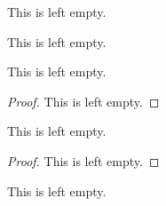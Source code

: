 \begin{example}
    This is left empty.
\end{example}

\begin{definition}
    This is left empty.
\end{definition}

\begin{proposition}
    This is left empty.
    \begin{proof}
        This is left empty.
    \end{proof}
\end{proposition}

\begin{proposition}
    This is left empty.
    \begin{proof}
        This is left empty.
    \end{proof}
\end{proposition}

\begin{definition}
    This is left empty.
\end{definition}

